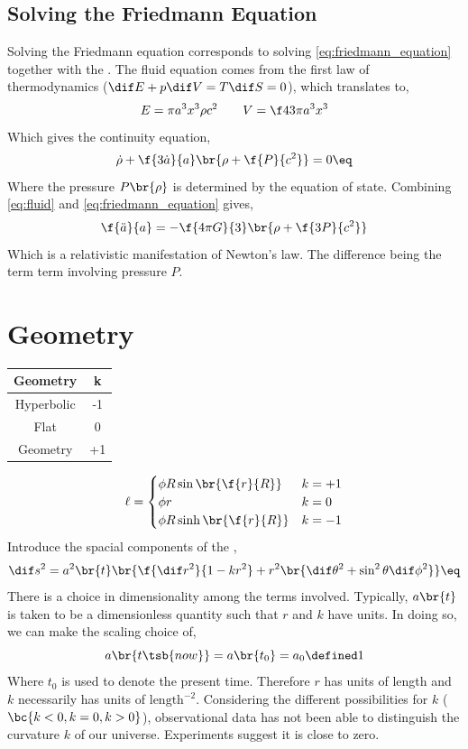 \documentclass{article}
\begin{document}
\subsection{Solving the Friedmann Equation}

Solving the Friedmann equation corresponds to solving \cref{eq:friedmann_equation} together with the . The fluid equation comes from the first law of thermodynamics ($\dif E + p \dif V = T \dif S = 0$), which translates to,
\[ E = \pi a^3 x^3 \rho c^2 \qquad V = \f43 \pi a^3 x^3 \]
Which gives the continuity equation,
\[ \dot{\rho} + \f{3\dot{a}}{a} \br{\rho + \f{P}{c^2}} = 0 \eq \label{eq:fluid}\]
Where the pressure $P\br{\rho}$ is determined by the equation of state. Combining \cref{eq:fluid} and \cref{eq:friedmann_equation} gives,
\[ \f{\ddot{a}}{a} = - \f{4 \pi G}{3} \br{\rho + \f{3P}{c^2}} \]
Which is a relativistic manifestation of Newton's law. The difference being the term term involving pressure $P$.

\section{Geometry}

\begin{center}
\begin{tabular}{|c|c|}
    \hline
    Geometry & k \\
    \hline
    Hyperbolic & -1 \\
    Flat & 0 \\
    Geometry & +1 \\
    \hline
\end{tabular}
\end{center}
\[ \ell = \begin{cases}
    \phi R \sin\br{\f{r}{R}} & k = +1 \\
    \phi r & k = 0 \\
    \phi R \sinh\br{\f{r}{R}} & k = -1 \\
\end{cases} \]
Introduce the spacial components of the ,
\[ \dif s^2 = a^2\br{t}\br{\f{\dif r^2}{1 - kr^2} + r^2 \br{\dif \theta^2 + \sin^2 \theta \dif \phi^2}} \eq \label{eq:FLRW}\]
There is a choice in dimensionality among the terms involved. Typically, $a\br{t}$ is taken to be a dimensionless quantity such that $r$ and $k$ have units. In doing so, we can make the scaling choice of,
\[ a\br{t\tsb{now}} = a\br{t_0} = a_0 \defined 1 \]
Where $t_0$ is used to denote the present time. Therefore $r$ has units of length and $k$ necessarily has units of $\text{length}^{-2}$. Considering the different possibilities for $k$ ($\bc{k < 0, k = 0, k > 0}$), observational data has not been able to distinguish the curvature $k$ of our universe. Experiments suggest it is close to zero. \\
\end{document}
